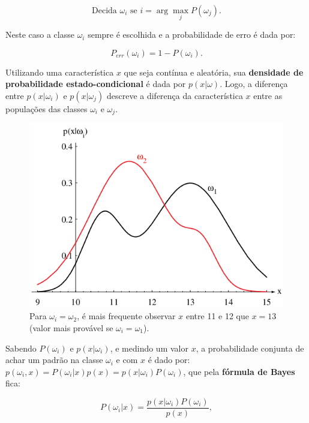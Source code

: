 \documentclass[a4paper,12pt,twocolumn]{article}
\begin{document}
\begin{equation}
    \text{Decida } \omega_i \text{ se } i = \arg\max_j P(\omega_j).
    \label{eq:decision_1}
\end{equation}

\noindent Neste caso a classe $\omega_i$ sempre é escolhida e a probabilidade de erro é dada por:

\begin{equation}
    P_{err}(\omega_i) = 1 - P(\omega_i).
    \label{eq:prob_i_error}
\end{equation}

Utilizando uma característica $x$ que seja contínua e aleatória, sua \textbf{densidade de probabilidade estado-condicional} é dada por $p(x|\omega)$. Logo, a diferença entre $p(x|\omega_i)$ e $p(x|\omega_j)$ descreve a diferença da característica $x$ entre as populações das classes $\omega_i$ e $\omega_j$.

\begin{figure}[ht]
    \centering
    \includegraphics[width=\columnwidth]{state-conditional_pdf}
    \caption{Para $\omega_i = \omega_2$, é mais frequente observar $x$ entre 11 e 12 que $x = 13$ (valor mais provável se $\omega_i = \omega_1$).}
    \label{fig:state-conditional_pdf}
\end{figure}

Sabendo $P(\omega_i)$ e $p(x|\omega_i)$, e medindo um valor $x$, a probabilidade conjunta de achar um padrão na classe $\omega_i$ e com $x$ é dado por: $p(\omega_i,x) = P(\omega_i|x)p(x) = p(x|\omega_i)P(\omega_i)$, que pela \textbf{fórmula de Bayes} fica:

\begin{equation}
    P(\omega_i|x) = \frac{p(x|\omega_i)P(\omega_i)}{p(x)},
    \label{eq:bayes}
\end{equation}
\end{document}
